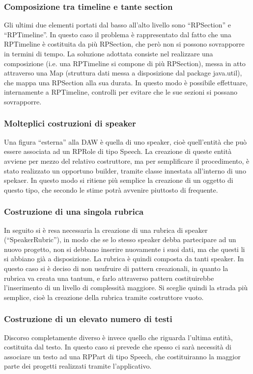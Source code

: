 \documentclass[a4paper,12pt]{report}
\begin{document}
\subsubsection{Composizione tra timeline e tante section}
Gli ultimi due elementi portati dal basso all’alto livello sono “RPSection” e “RPTimeline”. In questo caso il problema è rappresentato dal fatto che una RPTimeline è costituita da più RPSection, che però non si possono sovrapporre in termini di tempo. La soluzione adottata consiste nel realizzare una composizione (i.e. una RPTimeline si compone di più RPSection), messa in atto attraverso una Map (struttura dati messa a disposizione dal package java.util), che mappa una RPSection alla sua durata. In questo modo è possibile effettuare, internamente a RPTimeline, controlli per evitare che le sue sezioni si possano sovrapporre.
\endsubsubsection
\subsubsection{Molteplici costruzioni di speaker}
Una figura “esterna” alla DAW è quella di uno speaker, cioè quell’entità che può essere associata ad un RPRole di tipo Speech. La creazione di queste entità avviene per mezzo del relativo costruttore, ma per semplificare il procedimento, è stato realizzato un opportuno builder, tramite classe innestata all’interno di uno spekaer. In questo modo si ritiene più semplice la creazione di un oggetto di questo tipo, che secondo le stime potrà avvenire piuttosto di frequente.
\endsubsubsection
\subsubsection{Costruzione di una singola rubrica}
In seguito si è resa necessaria la creazione di una rubrica di speaker (“SpeakerRubric”), in modo che se lo stesso speaker debba partecipare ad un nuovo progetto, non si debbano inserire nuovamente i suoi dati, ma che questi li si abbiano già a disposizione. La rubrica è quindi composta da tanti speaker. In questo caso si è deciso di non usufruire di pattern creazionali, in quanto la rubrica va creata una tantum, e farlo attraverso pattern costituirebbe l’inserimento di un livello di complessità maggiore. Si sceglie quindi la strada più semplice, cioè la creazione della rubrica tramite costruttore vuoto.
\endsubsubsection
\subsubsection{Costruzione di un elevato numero di testi}
Discorso completamente diverso è invece quello che riguarda l’ultima entità, costituita dal testo. In questo caso si prevede che spesso ci sarà necessità di associare un testo ad una RPPart di tipo Speech, che costituiranno la maggior parte dei progetti realizzati tramite l’applicativo. 
\end{document}
